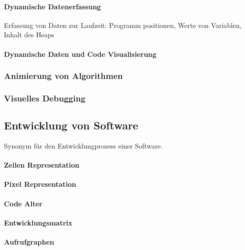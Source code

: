 \documentclass[ngerman]{scrartcl}
\begin{document}
\paragraph{Dynamische Datenerfassung} Erfassung von Daten zur Laufzeit: Programm positionen, Werte von Variablen, Inhalt des Heaps

\paragraph{Dynamische Daten und Code Visualisierung}











\subsubsection{Animierung von Algorithmen}

\subsubsection{Visuelles Debugging}



\subsection{Entwicklung von Software}
Synonym für den Entwicklungprozess einer Software.

\paragraph{Zeilen Representation}

\paragraph{Pixel Representation}

\paragraph{Code Alter}

\paragraph{Entwicklungsmatrix}

\paragraph{Aufrufgraphen}
\end{document}
